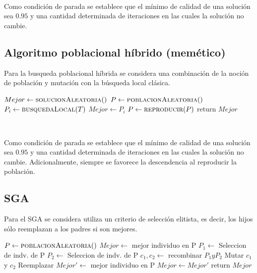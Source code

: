 \documentclass[11pt]{article}
\begin{document}
    ~\ 

    Como condición de parada se establece que el mínimo de calidad de una solución sea $0.95$ y una cantidad determinada de iteraciones en las cuales la solución no cambie.


    \subsection{Algoritmo poblacional híbrido (memético)}
    Para la busqueda poblacional híbrida se considera una combinación de la noción de población y mutación con la búsqueda local clásica.

    {\fontsize{9}{12}\selectfont
    \begin{algorithmic}
            \State $Mejor \gets \Call{solucionAleatoria}$
            \State $P \gets \Call{poblacionAleatoria}$
                  \State $P_i \gets \Call{busquedaLocal}{T}$
                        \State $Mejor \gets P_i$
                    \EndIf
                \EndFor
            \State $P \gets \Call{reproducir}{P}$
            \EndWhile
            \State return $Mejor$
        \EndFunction
    \end{algorithmic}
    }

    ~\ 

    Como condición de parada se establece que el mínimo de calidad de una solución sea $0.95$ y una cantidad determinada de iteraciones en las cuales la solución no cambie. Adicionalmente, siempre se favorece la descendencia al reproducir la población.



    \subsection{SGA}
    Para el SGA se considera utiliza un criterio de selección elitista, es decir, los hijos sólo reemplazan a los padres si son mejores. \\

    {\fontsize{10}{12}\selectfont
    \begin{algorithmic}
            \State $P \gets \Call{poblacionAleatoria}$
            \State $Mejor \gets $ mejor individuo en P
                \State $P_1 \gets $ Seleccion de indv. de P  
                \State $P_2 \gets $ Seleccion de indv. de P 
                \State $c_1,c_2 \gets $ recombinar $P_1 y P_2$
                \State Mutar $c_1$ y $c_2$ 
                    \State Reemplazar
                \EndIf
                \State $Mejor' \gets $ mejor individuo en P 
                    \State $Mejor \gets Mejor'$
                \EndIf
            \EndWhile
            \State return $Mejor$
        \EndFunction
    \end{algorithmic}
    }
\end{document}
